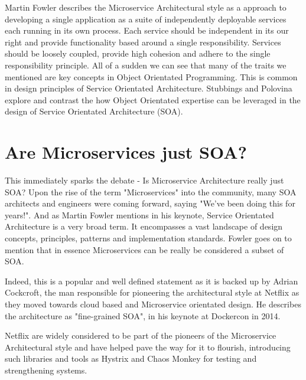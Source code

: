 \documentclass[journal]{IEEEtran}
\begin{document}
Martin Fowler describes the Microservice Architectural style as a approach to developing a single application as a suite of independently deployable services each running in its own process. \cite{MicroservicesResourceGuide} Each service should be independent in its our right and provide functionality based around a single responsibility. Services should be loosely coupled, provide high cohesion and adhere to the single responsibility principle. All of a sudden we can see that many of the traits we mentioned are key concepts in Object Orientated Programming. This is common in design principles of Service Orientated Architecture. Stubbings and Polovina \cite{StubbingsPolovina} explore and contrast the how Object Orientated expertise can be leveraged in the design of Service Orientated Architecture (SOA).



\section{Are Microservices just SOA?}

This immediately sparks the debate - Is Microservice Architecture really just SOA? Upon the rise of the term "Microservices" into the community, many SOA architects and engineers were coming forward, saying "We've been doing this for years!". And as Martin Fowler mentions in his keynote\cite{GOTOConference}, Service Orientated Architecture is a very broad term. It encompasses a vast landscape of design concepts, principles, patterns and implementation standards. Fowler goes on to mention that in essence Microservices can be really be considered a subset of SOA.

Indeed, this is a popular and well defined statement as it is backed up by Adrian Cockcroft, the man responsible for pioneering the architectural style at Netflix as they moved towards cloud based and Microservice orientated design. He describes the architecture as "fine-grained SOA", in his keynote at Dockercon in 2014. \cite{adriancockcroft}

Netflix are widely considered to be part of the pioneers of the Microservice Architectural style and have helped pave the way for it to flourish, introducing such libraries and tools as Hystrix\cite{Hystrix} and Chaos Monkey\cite{ChaosMonkey} for testing and strengthening systems.
\end{document}
